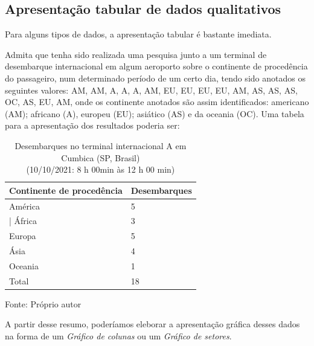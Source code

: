 \documentclass[
]{book}
\begin{document}
\hfill\break

\hypertarget{apresentauxe7uxe3o-tabular-de-dados-qualitativos}{%
\subsection{Apresentação tabular de dados qualitativos}\label{apresentauxe7uxe3o-tabular-de-dados-qualitativos}}

\hfill\break

Para alguns tipos de dados, a apresentação tabular é bastante imediata.

\hfill\break

Admita que tenha sido realizada uma pesquisa junto a um terminal de desembarque internacional em algum aeroporto sobre o continente de procedência do passageiro, num determinado período de um certo dia, tendo sido anotados os seguintes valores: AM, AM, A, A, A, AM, EU, EU, EU, EU, AM, AS, AS, AS, OC, AS, EU, AM, onde os continente anotados são assim identificados: americano (AM); africano (A), europeu (EU); asiático (AS) e da oceania (OC). Uma tabela para a apresentação dos resultados poderia ser:

\hfill\break

\begin{table}[h]
\centering
\caption{Desembarques no terminal internacional A em Cumbica (SP, Brasil) \\\hspace{\textwidth} (10/10/2021: 8 h 00min às 12 h 00 min)}
\begin{tabular}{|l|l|}
\hline
Continente de procedência   &  Desembarques  \\
\hline
América & 5 \\                                |
África  & 3 \\                           
Europa  & 5 \\                          
Ásia    & 4 \\                          
Oceania & 1 \\                        
\hline
Total  & 18 \\   
\hline
\end{tabular}
\vspace{4pt}
Fonte: Próprio autor
\end{table} 

\hfill\break

A partir desse resumo, poderíamos eleborar a apresentação gráfica desses dados na forma de um \emph{Gráfico de colunas} ou um \emph{Gráfico de setores}.
\end{document}
